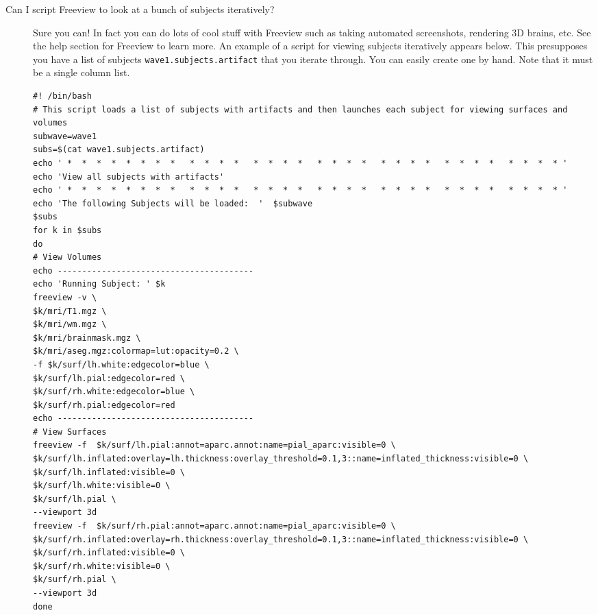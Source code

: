 \documentclass[paper=a4, fontsize=11pt]{scrartcl} %
\numberwithin{equation}{section} %
\numberwithin{figure}{section} %
\numberwithin{table}{section} %
\begin{document}
\begin{appendices}
\begin{description}
\newpage
\item[Can I script Freeview to look at a bunch of subjects iteratively?]  Sure you can!  In fact you can do lots of cool stuff with Freeview such as taking automated screenshots, rendering 3D brains, etc.  See the help section for Freeview to learn more.  An example of a script for viewing subjects iteratively appears below.  This presupposes you have a list of subjects \texttt{wave1.subjects.artifact} that you iterate through.  You can easily create one by hand.  Note that it must be a single column list.
\begin{lstlisting}
#! /bin/bash
# This script loads a list of subjects with artifacts and then launches each subject for viewing surfaces and volumes
subwave=wave1
subs=$(cat wave1.subjects.artifact)
echo ' *  *  *  *  *  *  *  *   *  *  *  *   *  *  *  *   *  *  *  *   *  *  *  *   *  *  *  *   *  *  *  * '
echo 'View all subjects with artifacts'
echo ' *  *  *  *  *  *  *  *   *  *  *  *   *  *  *  *   *  *  *  *   *  *  *  *   *  *  *  *   *  *  *  * '
echo 'The following Subjects will be loaded:  '  $subwave
$subs
for k in $subs
do
# View Volumes
echo ----------------------------------------
echo 'Running Subject: ' $k
freeview -v \
$k/mri/T1.mgz \
$k/mri/wm.mgz \
$k/mri/brainmask.mgz \
$k/mri/aseg.mgz:colormap=lut:opacity=0.2 \
-f $k/surf/lh.white:edgecolor=blue \
$k/surf/lh.pial:edgecolor=red \
$k/surf/rh.white:edgecolor=blue \
$k/surf/rh.pial:edgecolor=red
echo ----------------------------------------
# View Surfaces
freeview -f  $k/surf/lh.pial:annot=aparc.annot:name=pial_aparc:visible=0 \
$k/surf/lh.inflated:overlay=lh.thickness:overlay_threshold=0.1,3::name=inflated_thickness:visible=0 \
$k/surf/lh.inflated:visible=0 \
$k/surf/lh.white:visible=0 \
$k/surf/lh.pial \
--viewport 3d
freeview -f  $k/surf/rh.pial:annot=aparc.annot:name=pial_aparc:visible=0 \
$k/surf/rh.inflated:overlay=rh.thickness:overlay_threshold=0.1,3::name=inflated_thickness:visible=0 \
$k/surf/rh.inflated:visible=0 \
$k/surf/rh.white:visible=0 \
$k/surf/rh.pial \
--viewport 3d
done
\end{lstlisting}
\end{description}


\end{appendices}
\end{document}
